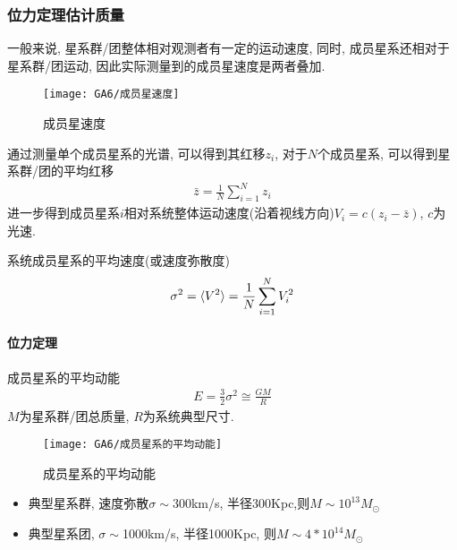 \subsubsection{位力定理估计质量}
一般来说, 星系群/团整体相对观测者有一定的运动速度, 同时, 成员星系还相对于星系群/团运动, 因此实际测量到的成员星速度是两者叠加. 
\begin{figure}[!htb]
    \centering
    \texttt{[image: GA6/成员星速度]}
    \caption{成员星速度}
\end{figure}

通过测量单个成员星系的光谱, 可以得到其红移$z_i$, 对于$N$个成员星系, 可以得到星系群/团的平均红移
\begin{align*}
    \bar{z}=\frac{1}{N}\sum_{i=1}^N z_i
\end{align*}
进一步得到成员星系$i$相对系统整体运动速度(沿着视线方向)$V_i=c(z_i-\bar{z})$, $c$为光速. 

系统成员星系的平均速度(或速度弥散度)
\begin{align*}
    \sigma^2=\braket{V^2}=\frac{1}{N}\sum_{i=1}^N V_i^2
\end{align*}

\paragraph{位力定理}
成员星系的平均动能
\begin{align*}
    E=\frac{3}{2}\sigma^2 \cong \frac{GM}{R}
\end{align*}
$M$为星系群/团总质量, $R$为系统典型尺寸. 

\begin{figure}[!htb]
    \centering
    \texttt{[image: GA6/成员星系的平均动能]}
    \caption{成员星系的平均动能}
\end{figure}

\begin{itemize}\small
    \item 典型星系群, 速度弥散$\sigma \sim $300km/s, 半径300Kpc,则$M\sim 10^{13} M_{\odot}$
    \item 典型星系团, $\sigma \sim $1000km/s, 半径1000Kpc, 则$M\sim 4*10^{14} M_{\odot}$
\end{itemize}

